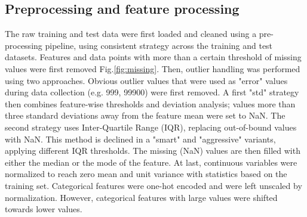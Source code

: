 \documentclass[10pt,conference,compsocconf]{IEEEtran}
\begin{document}
\subsection{Preprocessing and feature processing}
The raw training and test data were first loaded and cleaned using a pre-processing pipeline, using consistent strategy across the training and test datasets. 
Features and data points with more than a certain threshold of missing values were first removed Fig.\ref{fig:missing}.
Then, outlier handling was performed using two approaches. Obvious outlier values that were used as "error" values during data collection (e.g. 999, 99900) were first removed. A first "std" strategy then combines feature-wise thresholds and deviation analysis; values more than three standard deviations away from the feature mean were set to NaN. The second strategy uses Inter-Quartile Range (IQR), replacing out-of-bound values with NaN. This method is declined in a "smart" and "aggressive" variants, applying different IQR thresholds. The missing (NaN) values are then filled with either the median or the mode of the feature. 
At last, continuous variables were normalized to reach zero mean and unit variance with statistics based on the training set. Categorical features were one-hot encoded and were left unscaled by normalization. However, categorical features with large values were shifted towards lower values. 
\end{document}
